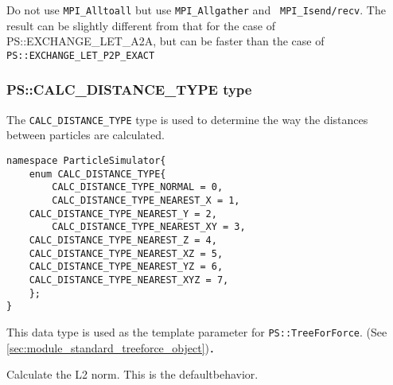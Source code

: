 
Do not use {\tt MPI\_Alltoall} but use {\tt MPI\_Allgather} and {\tt
MPI\_Isend/recv}. The result can be slightly different from that for
the case of PS::EXCHANGE\_LET\_A2A, but can be faster than
the case of {\tt PS::EXCHANGE\_LET\_P2P\_EXACT}





\subsubsection{PS::CALC\_DISTANCE\_TYPE type}
\label{sec:datatype_enum_calc_distance_type}


The {\tt CALC\_DISTANCE\_TYPE} type is used to determine the way the
distances between particles are calculated.


\begin{lstlisting}[caption=CALC\_DISTANCE\_TYPE]
namespace ParticleSimulator{
    enum CALC_DISTANCE_TYPE{
        CALC_DISTANCE_TYPE_NORMAL = 0,
        CALC_DISTANCE_TYPE_NEAREST_X = 1,
	CALC_DISTANCE_TYPE_NEAREST_Y = 2,
        CALC_DISTANCE_TYPE_NEAREST_XY = 3,
	CALC_DISTANCE_TYPE_NEAREST_Z = 4,
	CALC_DISTANCE_TYPE_NEAREST_XZ = 5,
	CALC_DISTANCE_TYPE_NEAREST_YZ = 6,
	CALC_DISTANCE_TYPE_NEAREST_XYZ = 7,
    };
}
\end{lstlisting}

This data type is used as the template parameter for {\tt PS::TreeForForce}.
(See \ref{sec:module_standard_treeforce_object})．



Calculate the L2 norm. This is the defaultbehavior.




